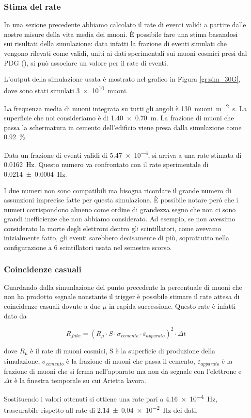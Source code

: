\subsubsection{Stima del rate}
In una sezione precedente abbiamo calcolato il rate di eventi validi a partire dalle nostre misure della vita media dei muoni. 
\`E possibile fare una stima basandosi sui risultati della simulazione: data infatti la frazione di eventi simulati che vengono rilevati come validi, uniti ai dati sperimentali sui muoni cosmici presi dal PDG (\cite{bib:Patrignani:2016xqp}), si pu\`o associare un valore per il rate di eventi.

L'output della simulazione usata \`e mostrato nel grafico in Figura \ref{gr:sim_30G}, dove sono stati simulati \SI{3e10}{muoni}.

La frequenza media di muoni integrata su tutti gli angoli \`e \SI{130}{muoni\per\square\metre\second}. La superficie che noi consideriamo \`e di \SI{1.40 x 0.70}{\m}. 
La frazione di muoni che passa la schermatura in cemento dell'edificio viene presa dalla simulazione come \SI{0.92}{\percent}.

Data un frazione di eventi validi di \num{5.47e-4}, si arriva a una rate stimata di \SI{0.0162}{\Hz}. 
Questo numero va confrontato con il rate sperimentale di \SI{0.0214 +- 0.0004}{\Hz}.

I due numeri non sono compatibili ma bisogna ricordare il grande numero di assunzioni imprecise fatte per questa simulazione. 
\`E possibile notare per\`o che i numeri corrispondono almeno come ordine di grandezza segno che non ci sono grandi inefficienze che non abbiamo considerato. 
Ad esempio, se non avessimo considerato la morte degli elettroni dentro gli scintillatori, come avevamo inizialmente fatto, gli eventi sarebbero decisamente di pi\`u, soprattutto nella configurazione a 6 scintillatori usata nel semestre scorso.

\subsubsection{Coincidenze casuali}
Guardando dalla simunlazione del punto precedente la percentuale di muoni che non ha prodotto segnale nonstante il trigger \`e possibile stimare il rate attesa di coincidenze casuali dovute a due $\mu$ in rapida successione.
Questo rate \`e infatti dato da

\begin{equation}
	R_{fake} = \left(R_\mu\cdot S\cdot\sigma_{cemento}\cdot\varepsilon_{apparato}\right)^2\cdot\Delta t
	\label{eq:fakes}
\end{equation}

dove $R_\mu$ \`e il rate di muoni cosmici, S \`e la superficie di produzione della simulazione, $\sigma_{cemento}$ \`e la frazione di muoni che passa il cemento, $\varepsilon_{apparato}$ \`e la frazione di muoni che si ferma nell'apparato ma non da segnale con l'elettrone e $\Delta t$ \`e la finestra temporale su cui Arietta lavora.

Sostituendo i valori ottenuti si ottiene una rate pari a \SI{4.16e-4}{\Hz}, trascurabile rispetto all rate di \SI{2.14 +- 0.04e-2}{\Hz} dei dati.
